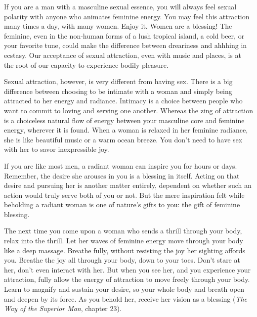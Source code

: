 			If you are a man with a masculine sexual essence, you will always feel sexual polarity with anyone who animates feminine energy. You may feel this attraction many times a day, with many women. Enjoy it. Women are a blessing! The feminine, even in the non-human forms of a lush tropical island, a cold beer, or your favorite tune, could make the difference between dreariness and ahhhing in ecstasy. Our acceptance of sexual attraction, even with music and places, is at the root of our capacity to experience bodily pleasure. 

			Sexual attraction, however, is very different from having sex. There is a big difference between choosing to be intimate with a woman and simply being attracted to her energy and radiance. Intimacy is a choice between people who want to commit to loving and serving one another. Whereas the zing of attraction is a choiceless natural flow of energy between your masculine core and feminine energy, wherever it is found. When a woman is relaxed in her feminine radiance, she is like beautiful music or a warm ocean breeze. You don't need to have sex with her to savor inexpressible joy. 

			If you are like most men, a radiant woman can inspire you for hours or days. Remember, the desire she arouses in you is a blessing in itself. Acting on that desire and pursuing her is another matter entirely, dependent on whether such an action would truly serve both of you or not. But the mere inspiration felt while beholding a radiant woman is one of nature's gifts to you: the gift of feminine blessing. 

			The next time you come upon a woman who sends a thrill through your body, relax into the thrill. Let her waves of feminine energy move through your body like a deep massage. Breathe fully, without resisting the joy her sighting affords you. Breathe the joy all through your body, down to your toes. Don't stare at her, don't even interact with her. But when you see her, and you experience your attraction, fully allow the energy of attraction to move freely through your body. Learn to magnify and sustain your desire, so your whole body and breath open and deepen by its force. As you behold her, receive her vision as a blessing (\textit{The Way of the Superior Man}, chapter 23).